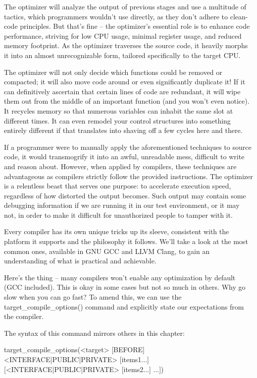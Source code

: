 
The optimizer will analyze the output of previous stages and use a multitude of tactics, which programmers wouldn’t use directly, as they don’t adhere to clean-code principles. But that’s fine – the optimizer’s essential role is to enhance code performance, striving for low CPU usage, minimal register usage, and reduced memory footprint. As the optimizer traverses the source code, it heavily morphs it into an almost unrecognizable form, tailored specifically to the target CPU.

The optimizer will not only decide which functions could be removed or compacted; it will also move code around or even significantly duplicate it! If it can definitively ascertain that certain lines of code are redundant, it will wipe them out from the middle of an important function (and you won’t even notice). It recycles memory so that numerous variables can inhabit the same slot at different times. It can even remodel your control structures into something entirely different if that translates into shaving off a few cycles here and there.

If a programmer were to manually apply the aforementioned techniques to source code, it would transmogrify it into an awful, unreadable mess, difficult to write and reason about. However, when applied by compilers, these techniques are advantageous as compilers strictly follow the provided instructions. The optimizer is a relentless beast that serves one purpose: to accelerate execution speed, regardless of how distorted the output becomes. Such output may contain some debugging information if we are running it in our test environment, or it may not, in order to make it difficult for unauthorized people to tamper with it.

Every compiler has its own unique tricks up its sleeve, consistent with the platform it supports and the philosophy it follows. We’ll take a look at the most common ones, available in GNU GCC and LLVM Clang, to gain an understanding of what is practical and achievable.

Here’s the thing – many compilers won’t enable any optimization by default (GCC included). This is okay in some cases but not so much in others. Why go slow when you can go fast? To amend this, we can use the target\_compile\_options() command and explicitly state our expectations from the compiler.

The syntax of this command mirrors others in this chapter:

\begin{shell}
target_compile_options(<target> [BEFORE]
                       <INTERFACE|PUBLIC|PRIVATE> [items1...]
                      [<INTERFACE|PUBLIC|PRIVATE> [items2...]
...])
\end{shell}

